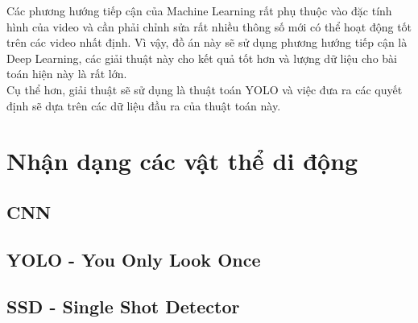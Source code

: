 \documentclass[a4paper,10pt]{article}
\begin{document}
Các phương hướng tiếp cận của Machine Learning rất phụ thuộc vào đặc tính hình của video và cần phải chỉnh sửa rất nhiều thông số mới có thể hoạt động tốt trên các video nhất định. Vì vậy, đồ án này sẽ sử dụng phương hướng tiếp cận là Deep Learning, các giải thuật này cho kết quả tốt hơn và lượng dữ liệu cho bài toán hiện này là rất lớn.
\\
Cụ thể hơn, giải thuật sẽ sử dụng là thuật toán YOLO và việc đưa ra các quyết định sẽ dựa trên các dữ liệu đầu ra của thuật toán này.

\section{Nhận dạng các vật thể di động}
    \subsection{CNN}
	\subsection{YOLO - You Only Look Once}
 \subsection{SSD - Single Shot Detector}
\end{document}
